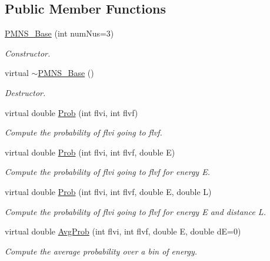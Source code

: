 \subsection*{Public Member Functions}
\begin{DoxyCompactItemize}
\item 
\hyperlink{classOscProb_1_1PMNS__Base_aa53e83b03a9cf4bdfa0a07136bd17a79}{P\+M\+N\+S\+\_\+\+Base} (int num\+Nus=3)
\begin{DoxyCompactList}\small\item\em Constructor. \end{DoxyCompactList}\item 
virtual \hyperlink{classOscProb_1_1PMNS__Base_a91223a852214dd90da9b4403f779dbbf}{$\sim$\+P\+M\+N\+S\+\_\+\+Base} ()
\begin{DoxyCompactList}\small\item\em Destructor. \end{DoxyCompactList}\item 
virtual double \hyperlink{classOscProb_1_1PMNS__Base_aec5c399b93261f1962a4b7dbbb44b973}{Prob} (int flvi, int flvf)
\begin{DoxyCompactList}\small\item\em Compute the probability of flvi going to flvf. \end{DoxyCompactList}\item 
virtual double \hyperlink{classOscProb_1_1PMNS__Base_aa3cee10639d5c0879ccb9e78d62128d3}{Prob} (int flvi, int flvf, double E)
\begin{DoxyCompactList}\small\item\em Compute the probability of flvi going to flvf for energy E. \end{DoxyCompactList}\item 
virtual double \hyperlink{classOscProb_1_1PMNS__Base_a6e0a74508d9d6db7be02e242b8467563}{Prob} (int flvi, int flvf, double E, double L)
\begin{DoxyCompactList}\small\item\em Compute the probability of flvi going to flvf for energy E and distance L. \end{DoxyCompactList}\item 
virtual double \hyperlink{classOscProb_1_1PMNS__Base_ac03f754160422e6600da8dbae0f803ed}{Avg\+Prob} (int flvi, int flvf, double E, double dE=0)
\begin{DoxyCompactList}\small\item\em Compute the average probability over a bin of energy. \end{DoxyCompactList}\item 

\end{DoxyCompactItemize}
